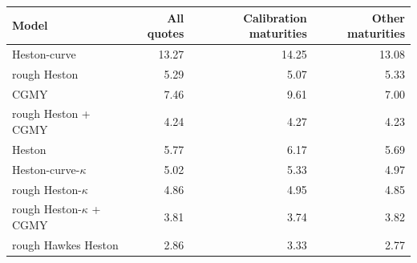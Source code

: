 \begin{tabular}{lrrr}
\toprule
Model & All quotes & Calibration maturities & Other maturities\\
\midrule
Heston-curve & 13.27 & 14.25 & 13.08\\
rough Heston & 5.29 & 5.07 & 5.33\\
CGMY & 7.46 & 9.61 & 7.00\\
rough Heston + CGMY & 4.24 & 4.27 & 4.23\\
\addlinespace
Heston & 5.77 & 6.17 & 5.69\\
Heston-curve-$\kappa$ & 5.02 & 5.33 & 4.97\\
rough Heston-$\kappa$ & 4.86 & 4.95 & 4.85\\
rough Heston-$\kappa$ + CGMY & 3.81 & 3.74 & 3.82\\
rough Hawkes Heston & 2.86 & 3.33 & 2.77\\
\bottomrule
\end{tabular}
